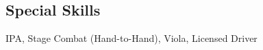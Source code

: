 \begin{resume}
\section{Special Skills}

IPA, Stage Combat (Hand-to-Hand), Viola, Licensed Driver


\end{resume}

